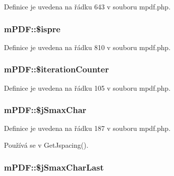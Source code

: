 Definice je uvedena na řádku 643 v souboru mpdf.\-php.

\hypertarget{classm_p_d_f_af496ecfe6223c99aaf9c694a1544aa6b}{
\subsubsection[{\$ispre}]{\setlength{\rightskip}{0pt plus 5cm}m\-P\-D\-F\-::\$ispre}}\label{classm_p_d_f_af496ecfe6223c99aaf9c694a1544aa6b}


Definice je uvedena na řádku 810 v souboru mpdf.\-php.

\hypertarget{classm_p_d_f_a635dabb7289168c36c5ad10711492b49}{
\subsubsection[{\$iteration\-Counter}]{\setlength{\rightskip}{0pt plus 5cm}m\-P\-D\-F\-::\$iteration\-Counter}}\label{classm_p_d_f_a635dabb7289168c36c5ad10711492b49}


Definice je uvedena na řádku 105 v souboru mpdf.\-php.

\hypertarget{classm_p_d_f_ae0e54411c78ddecf76421a0d6715cf33}{
\subsubsection[{\$j\-Smax\-Char}]{\setlength{\rightskip}{0pt plus 5cm}m\-P\-D\-F\-::\$j\-Smax\-Char}}\label{classm_p_d_f_ae0e54411c78ddecf76421a0d6715cf33}


Definice je uvedena na řádku 187 v souboru mpdf.\-php.



Používá se v Get\-Jspacing().

\hypertarget{classm_p_d_f_ac8374ddeb1ecf79ae2aab64e201a5574}{
\subsubsection[{\$j\-Smax\-Char\-Last}]{\setlength{\rightskip}{0pt plus 5cm}m\-P\-D\-F\-::\$j\-Smax\-Char\-Last}}\label{classm_p_d_f_ac8374ddeb1ecf79ae2aab64e201a5574}


